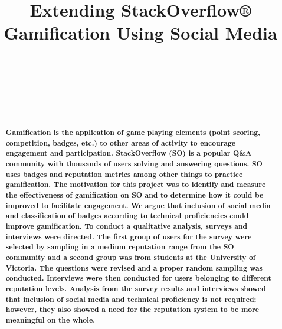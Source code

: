 \documentclass{sigchi}
\begin{document}
\title{Extending StackOverflow® Gamification Using Social Media}

\author{%
	\\
	\\
	\\
	\\
	\\
}

\maketitle

\begin{abstract}
\textbf{Gamification is the application of game playing elements (point scoring, competition, badges, etc.) to other areas of activity to encourage engagement and participation. StackOverflow (SO) is a popular Q\&A community with thousands of users solving and answering questions. SO uses badges and reputation metrics among other things to practice gamification.  The motivation for this project was to identify and measure the effectiveness of gamification on SO and to determine how it could be improved to facilitate engagement. We argue that inclusion of social media and classification of badges according to technical proficiencies could improve gamification. To conduct a qualitative analysis, surveys and interviews were directed. The first group of users for the survey were selected by sampling in a medium reputation range from the SO community and a second group was from students at the University of Victoria. The questions were revised and a proper random sampling was conducted. Interviews were then conducted for users belonging to different reputation levels. Analysis from the survey results and interviews showed that inclusion of social media and technical proficiency is not required; however, they also showed a need for the reputation system to be more meaningful on the whole.}
\end{abstract}
\end{document}

